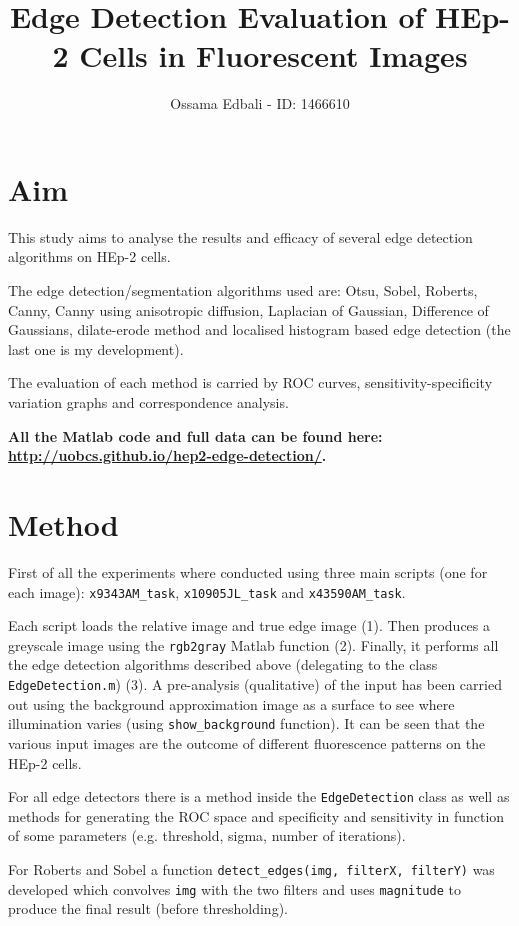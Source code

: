 \documentclass{article}
\title{Edge Detection Evaluation of HEp-2 Cells in Fluorescent Images}
\author{Ossama Edbali - ID: 1466610}
\begin{document}
	
	\maketitle	
	
	\section{Aim}
	
	This study aims to analyse the results and efficacy of several edge detection algorithms
	on HEp-2 cells.
	
	The edge detection/segmentation algorithms used are: Otsu, Sobel, Roberts, Canny,
	Canny using anisotropic diffusion,
	Laplacian of Gaussian, Difference of Gaussians, dilate-erode method and localised
	histogram based edge detection (the last one is my development).
	
	The evaluation of each method is carried by ROC curves, sensitivity-specificity variation graphs and correspondence analysis.
	
	\textbf{All the Matlab code and full data can be found here: \url{http://uobcs.github.io/hep2-edge-detection/}.}
	
	\section{Method}

	First of all the experiments where conducted using three main scripts (one for each
	image):
	\verb|x9343AM_task|, \verb|x10905JL_task| and \verb|x43590AM_task|.
	
	Each script loads the relative image and true edge image (1). Then produces a greyscale image using the \texttt{rgb2gray} Matlab function (2).
	Finally, it performs all the edge detection algorithms described above (delegating
		to the class \texttt{EdgeDetection.m}) (3).
	A pre-analysis (qualitative) of the input has been carried out using the
	background approximation image as a surface to see where illumination varies (using \verb|show_background| function).
	It can be seen that the various input images are the outcome of different fluorescence patterns on	the HEp-2 cells.
	
	For all edge detectors there is a method inside the \texttt{EdgeDetection} class
	as well as methods for generating the ROC space and specificity and sensitivity
	in function of some parameters (e.g. threshold, sigma, number of iterations).
	
	For Roberts and Sobel a function \verb|detect_edges(img, filterX, filterY)| was developed which convolves \verb|img| with the two filters and uses
	\verb|magnitude| to produce the final result (before thresholding).
	
\end{document}
